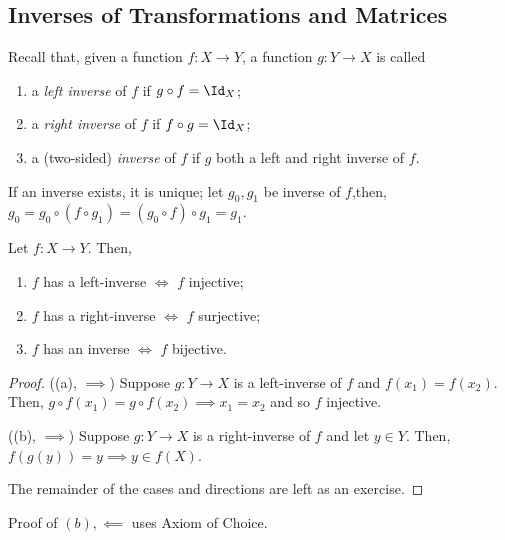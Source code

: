 \subsection{Inverses of Transformations and Matrices}

\begin{remark}
    Recall that, given a function $f: X \to Y$, a function $g: Y \to X$ is called \begin{enumerate}
        \item a \emph{left inverse} of $f$ if $g \circ f = \Id_X$;
        \item a \emph{right inverse} of $f$ if $f \circ g = \Id_X$;
        \item a (two-sided) \emph{inverse} of $f$ if $g$ both a left and right inverse of $f$.
    \end{enumerate}
    If an inverse exists, it is unique; let $g_0, g_1$ be inverse of $f$,then, $g_0 = g_0 \circ (f \circ g_1) = (g_0 \circ f) \circ g_1 = g_1$.
\end{remark}

\begin{proposition}
    Let $f: X \to Y$. Then, \begin{enumerate}
        \item $f$ has a left-inverse $\iff$ $f$ injective;
        \item $f$ has a right-inverse $\iff$ $f$ surjective;
        \item $f$ has an inverse $\iff$ $f$ bijective.
    \end{enumerate}
\end{proposition}

\begin{proof}
    ((a), $\implies$) Suppose $g: Y\to X$ is a left-inverse of $f$ and $f(x_1) = f(x_2)$. Then, $g \circ f(x_1) = g \circ f(x_2) \implies x_1 = x_2$ and so $f$ injective. 

    \noindent((b), $\implies$) Suppose $g: Y \to X$ is a right-inverse of $f$ and let $y \in Y$. Then, $f(g(y)) = y \implies y \in f(X)$.

    The remainder of the cases and directions are left as an exercise.
\end{proof}

\begin{remark}
    Proof of $(b), \impliedby$ uses Axiom of Choice.
\end{remark}

